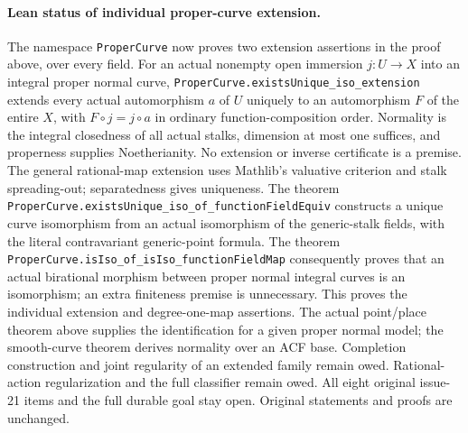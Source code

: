 \documentclass[11pt,oneside]{article}
\theoremstyle{definition}
\theoremstyle{remark}
\newcommand{\lean}[1]{\nolinkurl{#1}}
\begin{document}
\paragraph{Lean status of individual proper-curve extension.}
The namespace \lean{ProperCurve} now proves two extension assertions in the proof above,
over every field. For an actual nonempty open immersion $j:U\to X$ into an integral
proper normal curve, \lean{ProperCurve.existsUnique_iso_extension} extends every actual
automorphism $a$ of $U$ uniquely to an automorphism $F$ of the entire $X$, with
$F\circ j=j\circ a$ in ordinary function-composition order. Normality is the integral closedness of all
actual stalks, dimension at most one suffices, and properness supplies Noetherianity.
No extension or inverse certificate is a premise. The general rational-map extension
uses Mathlib's valuative criterion and stalk spreading-out; separatedness gives uniqueness.
The theorem \lean{ProperCurve.existsUnique_iso_of_functionFieldEquiv} constructs a unique
curve isomorphism from an actual isomorphism of the generic-stalk fields, with the literal
contravariant generic-point formula. The theorem
\lean{ProperCurve.isIso_of_isIso_functionFieldMap} consequently proves that an actual
birational morphism between proper normal integral curves is an isomorphism; an extra
finiteness premise is unnecessary. This proves the individual extension and degree-one-map
assertions. The actual point/place theorem above supplies the identification for a given
proper normal model; the smooth-curve theorem derives normality over an ACF base.
Completion construction and joint regularity of an extended family remain owed. Rational-action
regularization and the full classifier remain owed. All eight original issue-21 items and
the full durable goal stay open. Original statements and proofs are unchanged.
\end{document}
